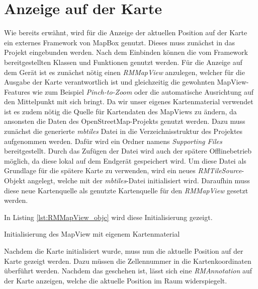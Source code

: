 \section{Anzeige auf der Karte}
\label{sec:implementation:map}
Wie bereits erwähnt, wird für die Anzeige der aktuellen Position auf der Karte ein externes Framework von MapBox genutzt.
Dieses muss zunächst in das Projekt eingebunden werden. 
Nach dem Einbinden können die vom Framework bereitgestellten Klassen und Funktionen genutzt werden.
Für die Anzeige auf dem Gerät ist es zunächst nötig einen \emph{RMMapView} anzulegen, welcher für die Ausgabe der Karte verantwortlich ist und gleichzeitig die gewohnten MapView-Features wie zum Beispiel \emph{Pinch-to-Zoom} oder die automatische Ausrichtung auf den Mittelpunkt mit sich bringt.
Da wir unser eigenes Kartenmaterial verwendet ist es zudem nötig die Quelle für Kartendaten des MapViews zu ändern, da ansonsten die Daten des OpenStreetMap-Projekts genutzt werden.
Dazu muss zunächst die generierte \emph{mbtiles} Datei in die Verzeichnisstruktur des Projektes aufgenommen werden. Dafür wird ein Ordner namens \emph{Supporting Files} bereitgestellt. Durch das Zufügen der Datei wird auch der spätere Offlinebetrieb möglich, da diese lokal auf dem Endgerät gespeichert wird.
Um diese Datei als Grundlage für die spätere Karte zu verwenden, wird ein neues \emph{RMTileSource}-Objekt angelegt, welche mit der \emph{mbtiles}-Datei initialisiert wird. Daraufhin muss diese neue Kartenquelle als genutzte Kartenquelle für den \emph{RMMapView} gesetzt werden.
  
In Listing \ref{lst:RMMapView_objc} wird diese Initialisierung gezeigt.
\begin{listing}[htb!]
    \caption{Initialisierung des MapView mit eigenem Kartenmaterial}
	\label{lst:RMMapView_objc}
\end{listing}

Nachdem die Karte initialisiert wurde, muss nun die aktuelle Position auf der Karte gezeigt werden. Dazu müssen die Zellennummer in die Kartenkoordinaten überführt werden. Nachdem das geschehen ist, lässt sich eine \emph{RMAnnotation} auf der Karte anzeigen, welche die aktuelle Position im Raum widerspiegelt.